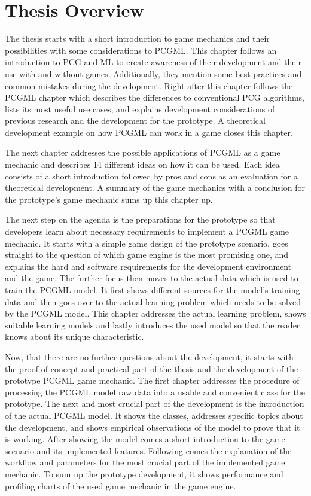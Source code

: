 \documentclass[MGS,Master,english]{twbook}%
\begin{document}
\section{Thesis Overview}
The thesis starts with a short introduction to game mechanics and their possibilities with some considerations to \ac{PCGML}. This chapter follows an introduction to \ac{PCG} and \ac{ML} to create awareness of their development and their use with and without games. Additionally, they mention some best practices and common mistakes during the development. Right after this chapter follows the \ac{PCGML} chapter which describes the differences to conventional \ac{PCG} algorithms, lists its most useful use cases, and explains development considerations of previous research and the development for the prototype. A theoretical development example on how \ac{PCGML} can work in a game closes this chapter.

The next chapter addresses the possible applications of \ac{PCGML} as a game mechanic and describes 14 different ideas on how it can be used. Each idea consists of a short introduction followed by pros and cons as an evaluation for a theoretical development. A summary of the game mechanics with a conclusion for the prototype's game mechanic sums up this chapter up.

The next step on the agenda is the preparations for the prototype so that developers learn about necessary requirements to implement a \ac{PCGML} game mechanic. It starts with a simple game design of the prototype scenario, goes straight to the question of which game engine is the most promising one, and explains the hard and software requirements for the development environment and the game. The further focus then moves to the actual data which is used to train the \ac{PCGML} model. It first shows different sources for the model's training data and then goes over to the actual learning problem which needs to be solved by the \ac{PCGML} model. This chapter addresses the actual learning problem, shows suitable learning models and lastly introduces the used model so that the reader knows about its unique characteristic.

Now, that there are no further questions about the development, it starts with the proof-of-concept and practical part of the thesis and the development of the prototype \ac{PCGML} game mechanic. The first chapter addresses the procedure of processing the \ac{PCGML} model raw data into a usable and convenient class for the prototype. The next and most crucial part of the development is the introduction of the actual \ac{PCGML} model. It shows the classes, addresses specific topics about the development, and shows empirical observations of the model to prove that it is working. After showing the model comes a short introduction to the game scenario and its implemented features. Following comes the explanation of the workflow and parameters for the most crucial part of the implemented game mechanic. To sum up the prototype development, it shows performance and profiling charts of the used game mechanic in the game engine.
\end{document}
